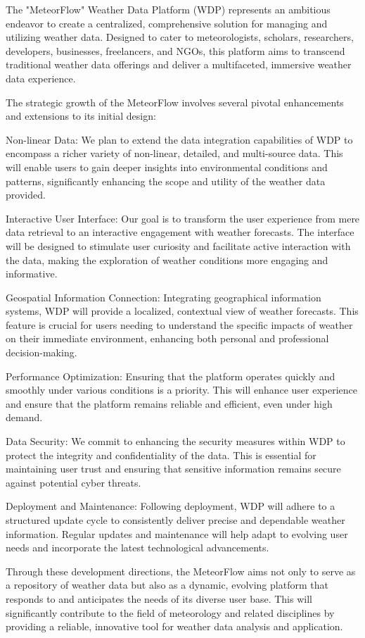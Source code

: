 The "MeteorFlow" Weather Data Platform (WDP) represents an ambitious endeavor to
create a centralized, comprehensive solution for managing and utilizing weather
data. Designed to cater to meteorologists, scholars, researchers, developers,
businesses, freelancers, and NGOs, this platform aims to transcend traditional
weather data offerings and deliver a multifaceted, immersive weather data
experience.

The strategic growth of the MeteorFlow involves several pivotal enhancements
and extensions to its initial design:

Non-linear Data: We plan to extend the data integration capabilities of WDP to
encompass a richer variety of non-linear, detailed, and multi-source data. This
will enable users to gain deeper insights into environmental conditions and
patterns, significantly enhancing the scope and utility of the weather data
provided.

Interactive User Interface: Our goal is to transform the user experience from
mere data retrieval to an interactive engagement with weather forecasts. The
interface will be designed to stimulate user curiosity and facilitate active
interaction with the data, making the exploration of weather conditions more
engaging and informative.

Geospatial Information Connection: Integrating geographical information systems,
WDP will provide a localized, contextual view of weather forecasts. This feature
is crucial for users needing to understand the specific impacts of weather on
their immediate environment, enhancing both personal and professional
decision-making.

Performance Optimization: Ensuring that the platform operates quickly and
smoothly under various conditions is a priority. This will enhance user
experience and ensure that the platform remains reliable and efficient, even
under high demand.

Data Security: We commit to enhancing the security measures within WDP to
protect the integrity and confidentiality of the data. This is essential for
maintaining user trust and ensuring that sensitive information remains secure
against potential cyber threats.

Deployment and Maintenance: Following deployment, WDP will adhere to a
structured update cycle to consistently deliver precise and dependable weather
information. Regular updates and maintenance will help adapt to evolving user
needs and incorporate the latest technological advancements.

Through these development directions, the MeteorFlow aims not only to serve
as a repository of weather data but also as a dynamic, evolving platform that
responds to and anticipates the needs of its diverse user base. This will
significantly contribute to the field of meteorology and related disciplines by
providing a reliable, innovative tool for weather data analysis and application.